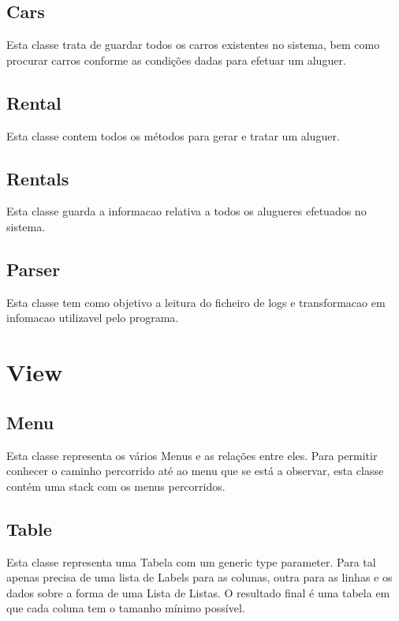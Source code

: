 \documentclass[a4paper]{report}
\begin{document}
\subsection{Cars}

Esta classe trata de guardar todos os carros existentes no sistema, bem
como procurar carros conforme as condições dadas para efetuar um aluguer.

\subsection{Rental}

Esta classe contem todos os métodos para gerar e tratar um aluguer.

\subsection{Rentals}

Esta classe guarda a informacao relativa a todos os alugueres efetuados
no sistema.

\subsection{Parser}

Esta classe tem como objetivo a leitura do ficheiro de logs e transformacao
em infomacao utilizavel pelo programa.

\section{View}

\subsection{Menu}

Esta classe representa os vários Menus e as relações entre eles. Para permitir
conhecer o caminho percorrido até ao menu que se está a observar, esta classe
contém uma stack com os menus percorridos.

\subsection{Table}

Esta classe representa uma Tabela com um generic type parameter. Para tal
apenas precisa de uma lista de Labels para as colunas, outra para as linhas e
os dados sobre a forma de uma Lista de Listas.
O resultado final é uma tabela em que cada coluna tem o tamanho mínimo possível.
\end{document}
